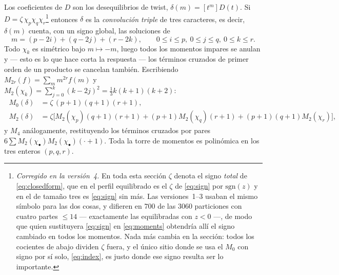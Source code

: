 \documentclass[11pt,a4paper]{article}
\begin{document}
Los coeficientes de $D$ son los desequilibrios de twist, $\delta(m)=[t^m]D(t)$. Si
$D=\zeta\,\chi_p\chi_q\chi_r$\footnote{\emph{Corregido en la versi\'on~4.} En toda esta secci\'on
$\zeta$ denota el signo \emph{total} de \eqref{eq:closedform}, que en el perfil equilibrado es el
$\zeta$ de \eqref{eq:sign} por $\mathrm{sgn}(z)$ y en el de tama\~no tres es \eqref{eq:sign} sin
m\'as. Las versiones~1--3 usaban el mismo s\'imbolo para las dos cosas, y difieren en $700$ de las
$3060$ particiones con cuatro partes $\le14$ --- exactamente las equilibradas con $z<0$ ---, de
modo que quien sustituyera \eqref{eq:sign} en \eqref{eq:moments} obtendr\'ia all\'i el signo
cambiado en todos los momentos. Nada m\'as cambia en la secci\'on: todos los cocientes de abajo
dividen $\zeta$ fuera, y el \'unico sitio donde se usa el $M_0$ con signo por s\'i solo,
\eqref{eq:index}, es justo donde ese signo resulta ser lo importante.} entonces $\delta$ es la \emph{convoluci\'on triple} de tres
caracteres, es decir, $\delta(m)$ cuenta, con un signo global, las soluciones de
\begin{equation}\label{eq:convolution}
m=(p-2i)+(q-2j)+(r-2k),\qquad 0\le i\le p,\ 0\le j\le q,\ 0\le k\le r .
\end{equation}
Todo $\chi_k$ es sim\'etrico bajo $m\mapsto-m$, luego todos los momentos impares se anulan y
--- esto es lo que hace corta la respuesta --- los t\'erminos cruzados de primer orden de un
producto se cancelan tambi\'en. Escribiendo $M_{2r}(f)=\sum_m m^{2r}f(m)$ y
$M_2(\chi_k)=\sum_{j=0}^{k}(k-2j)^2=\tfrac13k(k+1)(k+2)$:
\begin{equation}\label{eq:moments}
\boxed{\;
\begin{aligned}
M_0(\delta)&=\zeta\,(p{+}1)(q{+}1)(r{+}1),\\[2pt]
M_2(\delta)&=\zeta\Big[M_2(\chi_p)(q{+}1)(r{+}1)+(p{+}1)M_2(\chi_q)(r{+}1)
+(p{+}1)(q{+}1)M_2(\chi_r)\Big],
\end{aligned}\;}
\end{equation}
y $M_4$ an\'alogamente, restituyendo los t\'erminos cruzados por pares
$6\sum M_2(\chi_\bullet)M_2(\chi_\bullet)(\cdot+1)$. Toda la torre de momentos es polin\'omica
en los tres enteros $(p,q,r)$.
\end{document}
